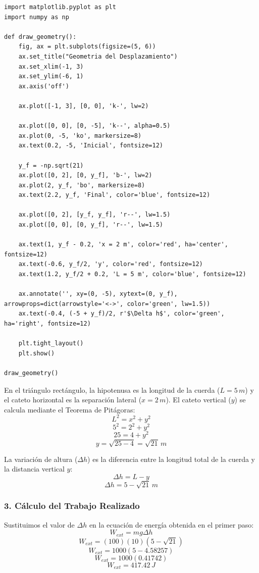\documentclass[12pt, a4paper]{article}
\begin{document}
\begin{lstlisting}
import matplotlib.pyplot as plt
import numpy as np

def draw_geometry():
    fig, ax = plt.subplots(figsize=(5, 6))
    ax.set_title("Geometria del Desplazamiento")
    ax.set_xlim(-1, 3)
    ax.set_ylim(-6, 1)
    ax.axis('off')

    ax.plot([-1, 3], [0, 0], 'k-', lw=2)

    ax.plot([0, 0], [0, -5], 'k--', alpha=0.5)
    ax.plot(0, -5, 'ko', markersize=8)
    ax.text(0.2, -5, 'Inicial', fontsize=12)

    y_f = -np.sqrt(21)
    ax.plot([0, 2], [0, y_f], 'b-', lw=2)
    ax.plot(2, y_f, 'bo', markersize=8)
    ax.text(2.2, y_f, 'Final', color='blue', fontsize=12)

    ax.plot([0, 2], [y_f, y_f], 'r--', lw=1.5)
    ax.plot([0, 0], [0, y_f], 'r--', lw=1.5)

    ax.text(1, y_f - 0.2, 'x = 2 m', color='red', ha='center', fontsize=12)
    ax.text(-0.6, y_f/2, 'y', color='red', fontsize=12)
    ax.text(1.2, y_f/2 + 0.2, 'L = 5 m', color='blue', fontsize=12)

    ax.annotate('', xy=(0, -5), xytext=(0, y_f), arrowprops=dict(arrowstyle='<->', color='green', lw=1.5))
    ax.text(-0.4, (-5 + y_f)/2, r'$\Delta h$', color='green', ha='right', fontsize=12)

    plt.tight_layout()
    plt.show()

draw_geometry()
\end{lstlisting}

En el triángulo rectángulo, la hipotenusa es la longitud de la cuerda ($L = 5 \, \si{m}$) y el cateto horizontal es la separación lateral ($x = 2 \, \si{m}$). El cateto vertical ($y$) se calcula mediante el Teorema de Pitágoras:
$$ L^2 = x^2 + y^2 $$
$$ 5^2 = 2^2 + y^2 $$
$$ 25 = 4 + y^2 $$
$$ y = \sqrt{25 - 4} = \sqrt{21} \, \si{m} $$

La variación de altura ($\Delta h$) es la diferencia entre la longitud total de la cuerda y la distancia vertical $y$:
$$ \Delta h = L - y $$
$$ \Delta h = 5 - \sqrt{21} \, \si{m} $$

\subsubsection*{3. Cálculo del Trabajo Realizado}
Sustituimos el valor de $\Delta h$ en la ecuación de energía obtenida en el primer paso:
$$ W_{ext} = mg \Delta h $$
$$ W_{ext} = (100)(10)(5 - \sqrt{21}) $$
$$ W_{ext} = 1000(5 - 4.58257) $$
$$ W_{ext} = 1000(0.41742) $$
$$ W_{ext} = 417.42 \, \si{J} $$
\end{document}
